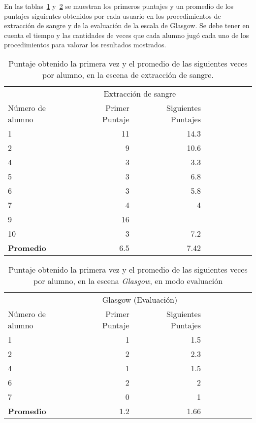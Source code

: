 En las tablas~\ref{tab:log_hemocultivo_puntaje}
y~\ref{tab:log_glasgow_random_puntaje} se muestran los primeros puntajes y un
promedio de los puntajes siguientes obtenidos por cada usuario en los
procedimientos de extracción de sangre y de la evaluación de la escala de
Glasgow. Se debe tener en cuenta el tiempo y las cantidades de veces que cada
alumno jugó cada uno de los procedimientos para valorar los resultados
mostrados. 

\begin{table}[H]
\centering
\begin{tabular}{lrrrrrrrr}
\toprule
& \multicolumn{2}{c}{Extracción de sangre} \\
\cmidrule(lr){2-3} 
Número de alumno  & Primer Puntaje & Siguientes Puntajes \\
\midrule
 1                & 11             & 14.3 \\
 2                & 9              & 10.6 \\
 4                & 3              & 3.3  \\
 5                & 3              & 6.8  \\
 6                & 3              & 5.8  \\
 7                & 4              & 4    \\
 9                & 16             & \\
10                & 3              & 7.2  \\
\midrule
\textbf{Promedio} & 6.5            & 7.42 \\
\bottomrule
\end{tabular}
\caption{Puntaje obtenido la primera vez y el promedio de las siguientes veces
    por alumno, en la escena de extracción de sangre.}
\label{tab:log_hemocultivo_puntaje}
\end{table}


\begin{table}[H]
\centering
\begin{tabular}{lrrrrrrrr}
\toprule
& \multicolumn{2}{c}{Glasgow (Evaluación)} \\
                   \cmidrule(lr){2-3} 
Número de alumno   & Primer Puntaje & Siguientes Puntajes \\
\midrule
1     & 1 & 1.5 \\
2     & 2 & 2.3 \\
4     & 1 & 1.5 \\
6     & 2 & 2 \\
7     & 0 & 1 \\
\midrule
\textbf{Promedio} & 1.2 & 1.66 \\
\bottomrule
\end{tabular}
\caption{Puntaje obtenido la primera vez y el promedio de las siguientes veces
    por alumno, en la escena \textit{Glasgow}, en modo evaluación}
\label{tab:log_glasgow_random_puntaje}
\end{table}

